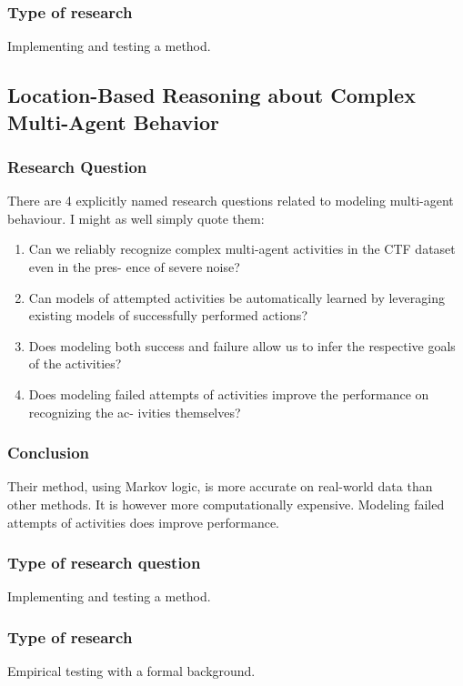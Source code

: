 \documentclass[a4paper, 10pt]{article}
\begin{document}
\subsubsection*{Type of research}
Implementing and testing a method.

\subsection{Location-Based Reasoning about Complex Multi-Agent Behavior}
\subsubsection*{Research Question}
There are 4 explicitly named research questions related to modeling multi-agent behaviour.
I might as well simply quote them:

\begin{enumerate}
\item Can we reliably recognize complex multi-agent activities in the CTF
  dataset even in the pres- ence of severe noise?
\item Can models of attempted activities be automatically learned by leveraging
  existing models of successfully performed actions?
\item Does modeling both success and failure allow us to infer the respective
  goals of the activities?
\item Does modeling failed attempts of activities improve the performance on
  recognizing the ac- ivities themselves?
\end{enumerate}

\subsubsection*{Conclusion}
Their method, using Markov logic, is more accurate on real-world data than other
methods. It is however more computationally expensive. Modeling failed attempts
of activities does improve performance.

\subsubsection*{Type of research question}
Implementing and testing a method.
\subsubsection*{Type of research}
Empirical testing with a formal background.
\end{document}
